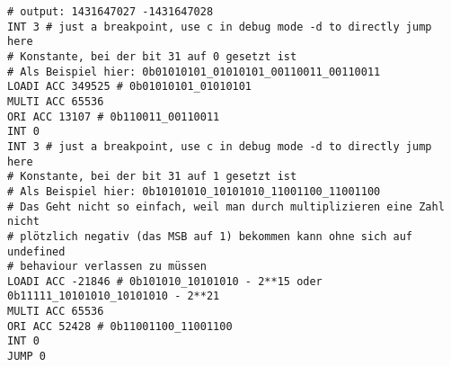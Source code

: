 \documentclass{article}
\begin{document}
%
\begin{verbatim}
# output: 1431647027 -1431647028
INT 3 # just a breakpoint, use c in debug mode -d to directly jump here
# Konstante, bei der bit 31 auf 0 gesetzt ist
# Als Beispiel hier: 0b01010101_01010101_00110011_00110011
LOADI ACC 349525 # 0b01010101_01010101
MULTI ACC 65536
ORI ACC 13107 # 0b110011_00110011
INT 0
INT 3 # just a breakpoint, use c in debug mode -d to directly jump here
# Konstante, bei der bit 31 auf 1 gesetzt ist
# Als Beispiel hier: 0b10101010_10101010_11001100_11001100
# Das Geht nicht so einfach, weil man durch multiplizieren eine Zahl nicht
# plötzlich negativ (das MSB auf 1) bekommen kann ohne sich auf undefined
# behaviour verlassen zu müssen
LOADI ACC -21846 # 0b101010_10101010 - 2**15 oder 0b11111_10101010_10101010 - 2**21
MULTI ACC 65536
ORI ACC 52428 # 0b11001100_11001100
INT 0
JUMP 0
\end{verbatim}
\end{document}
